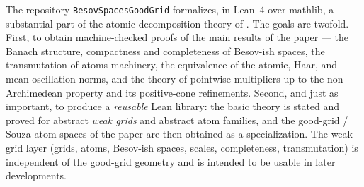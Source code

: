 \documentclass[11pt]{amsart}
\theoremstyle{definition}
\begin{document}
The repository \texttt{BesovSpacesGoodGrid} formalizes, in Lean~4 over
mathlib, a substantial part of the atomic decomposition theory of
\cite{paper}. The goals are twofold. First, to obtain machine-checked proofs
of the main results of the paper --- the Banach structure, compactness and
completeness of Besov-ish spaces, the transmutation-of-atoms machinery, the
equivalence of the atomic, Haar, and mean-oscillation norms, and the theory of
pointwise multipliers up to the non-Archimedean property and its
positive-cone refinements. Second, and just as important, to produce a
\emph{reusable} Lean library: the basic theory is stated and proved for
abstract \emph{weak grids} and abstract atom families, and the good-grid /
Souza-atom spaces of the paper are then obtained as a specialization. The
weak-grid layer (grids, atoms, Besov-ish spaces, scales, completeness,
transmutation) is independent of the good-grid geometry and is intended to be
usable in later developments.
\end{document}
